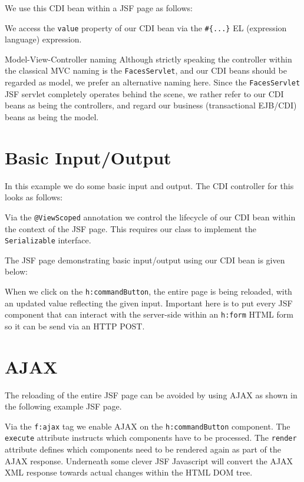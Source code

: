 We use this CDI bean within a JSF page as follows:

We access the \texttt{value} property of our CDI bean via the \texttt{\#\{...\}} EL (expression language) expression.

\begin{TIP}{Model-View-Controller naming}
	Although strictly speaking the controller within the classical MVC naming is the \texttt{FacesServlet}, and our CDI beans should be regarded as model,
	we prefer an alternative naming here.
	Since the \texttt{FacesServlet} JSF servlet completely operates behind the scene, we rather refer to our CDI beans as being the controllers,
	and regard our business (transactional EJB/CDI) beans as being the model.
\end{TIP}

\section{Basic Input/Output}
\label{sec:basic-input-output}

In this example we do some basic input and output.
The CDI controller for this looks as follows:

Via the \texttt{@ViewScoped} annotation we control the lifecycle of our CDI bean within the context of the JSF page.
This requires our class to implement the \texttt{Serializable} interface.

The JSF page demonstrating basic input/output using our CDI bean is given below:

When we click on the \texttt{h:commandButton}, the entire page is being reloaded, with an updated value reflecting the given input.
Important here is to put every JSF component that can interact with the server-side within an \texttt{h:form} HTML form so it can be send via an HTTP POST.


\section{AJAX}

The reloading of the entire JSF page can be avoided by using AJAX as shown in the following example JSF page.

Via the \texttt{f:ajax} tag we enable AJAX on the \texttt{h:commandButton} component.
The \texttt{execute} attribute instructs which components have to be processed.
The \texttt{render} attribute defines which components need to be rendered again as part of the AJAX response.
Underneath some clever JSF Javascript will convert the AJAX XML response towards actual changes within the HTML DOM tree.

